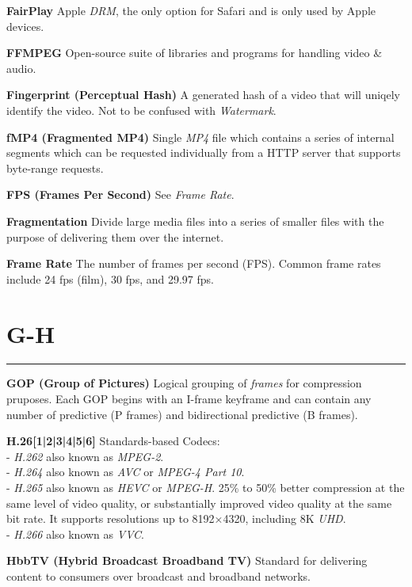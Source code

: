\smallskip
\textbf{FairPlay}
Apple \textit{DRM}, the only option for Safari and is only used by Apple devices.

\smallskip
\textbf{FFMPEG}
Open-source suite of libraries and programs for handling video \& audio.

\smallskip
\textbf{Fingerprint (Perceptual Hash)}
A generated hash of a video that will uniqely identify the video. Not to be confused with \textit{Watermark}.

\smallskip
\textbf{fMP4 (Fragmented MP4)}
Single \textit{MP4} file which contains a series of internal segments which can be requested individually from a HTTP server that supports byte-range requests.

\smallskip
\textbf{FPS (Frames Per Second)}
See \textit{Frame Rate}.

\smallskip
\textbf{Fragmentation}
Divide large media files into a series of smaller files with the purpose of delivering them over the internet.

\smallskip
\textbf{Frame Rate}
The number of frames per second (FPS). Common frame rates include 24 fps (film), 30 fps, and 29.97 fps.


\section{G-H}
\hrule

\medskip
\textbf{GOP (Group of Pictures)}
Logical grouping of \textit{frames} for compression pruposes. Each GOP begins with an I-frame keyframe and can contain any number of predictive (P frames) and bidirectional predictive (B frames).

\smallskip
\textbf{H.26[1|2|3|4|5|6]}
Standards-based Codecs:\\
 - \textit{H.262} also known as \textit{MPEG-2}.\\
 - \textit{H.264} also known as \textit{AVC} or  \textit{MPEG-4 Part 10}.\\
 - \textit{H.265} also known as \textit{HEVC} or \textit{MPEG-H}. 25\% to 50\% better compression at the same level of video quality, or substantially improved video quality at the same bit rate. It supports resolutions up to 8192×4320, including 8K \textit{UHD}.\\
 - \textit{H.266} also known as \textit{VVC}.

\smallskip
\textbf{HbbTV (Hybrid Broadcast Broadband TV)}
Standard for delivering content to consumers over broadcast and broadband networks.

